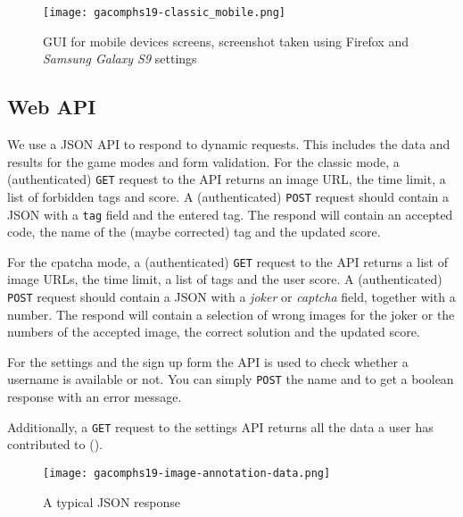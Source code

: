 \begin{figure}[!]
\centering
\texttt{[image: gacomphs19-classic\_mobile.png]}
\caption{GUI for mobile devices screens, screenshot taken using Firefox and \textit{Samsung Galaxy S9} settings}
\label{gacomphs19:fig:guiclassicmobile}
\end{figure}


\subsection{Web API}
\label{gacomphs19:sec:implementation:API}
We use a JSON API to respond to dynamic requests. This includes the data and results for the game modes and form validation.
For the classic mode, a (authenticated) \texttt{GET} request to the API returns an image URL, the time limit, a list of forbidden tags and score.
A (authenticated) \texttt{POST} request should contain a JSON with a \texttt{tag} field and the entered tag. The respond will contain an accepted code, the name of the (maybe corrected) tag and the updated score.

For the cpatcha mode, a (authenticated) \texttt{GET} request to the API returns a list of image URLs, the time limit, a list of tags and the user score.
A (authenticated) \texttt{POST} request should contain a JSON with a \textit{joker} or \textit{captcha} field, together with a number. The respond will contain a selection of wrong images for the joker or the numbers of the accepted image, the correct solution and the updated score.

For the settings and the sign up form the API is used to check whether a username is available or not. You can simply \texttt{POST} the name and to get a boolean response with an error message.

Additionally, a \texttt{GET} request to the settings API returns all the data a user has contributed to ().

\begin{figure}[!]
\centering
\texttt{[image: gacomphs19-image-annotation-data.png]}
\caption{A typical JSON response}
\label{gacomphs19:fig:webapi}
\end{figure}
